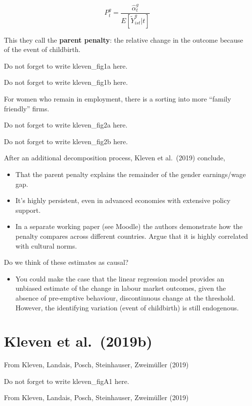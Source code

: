 \documentclass[
  letterpaper,
  DIV=11,
  numbers=noendperiod]{scrreprt}
\providecommand{\tightlist}{%
  \setlength{\itemsep}{0pt}\setlength{\parskip}{0pt}}\usepackage{longtable,booktabs,array}
\theoremstyle{definition}
\theoremstyle{remark}
\begin{document}
\[
P^g_t = \frac{\hat{\alpha}^g_t}{E[\tilde{Y}^g_{ist}|t]}
\]

This they call the \textbf{parent penalty}: the relative change in the
outcome because of the event of childbirth.

Do not forget to write kleven\_fig1a here.

Do not forget to write kleven\_fig1b here.

For women who remain in employment, there is a sorting into more
``family friendly'' firms.

Do not forget to write kleven\_fig2a here.

Do not forget to write kleven\_fig2b here.

After an additional decomposition process, Kleven et al.~(2019)
conclude,

\begin{itemize}
\tightlist
\item
  That the parent penalty explains the remainder of the gender
  earnings/wage gap.
\item
  It's highly persistent, even in advanced economies with extensive
  policy support.
\item
  In a separate working paper (see Moodle) the authors demonstrate how
  the penalty compares across different countries. Argue that it is
  highly correlated with cultural norms.
\end{itemize}

Do we think of these estimates as causal?

\begin{itemize}
\tightlist
\item
  You could make the case that the linear regression model provides an
  unbiased estimate of the change in labour market outcomes, given the
  absence of pre-emptive behaviour, discontinuous change at the
  threshold. However, the identifying variation (event of childbirth) is
  still endogenous.
\end{itemize}

\hypertarget{kleven-et-al.-2019b}{%
\chapter{Kleven et al.~(2019b)}\label{kleven-et-al.-2019b}}

From Kleven, Landais, Posch, Steinhauser, Zweimüller (2019)

Do not forget to write kleven\_figA1 here.

From Kleven, Landais, Posch, Steinhauser, Zweimüller (2019)
\end{document}
